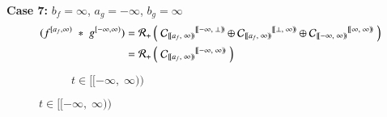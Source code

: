 \textbf{Case 7:} $b_f=\infty$, $a_g =-\infty$, $b_g=\infty$
\begin{align*}
	(f^{[a_f,\infty)} \;*\; g^{[-\infty,\infty)})
	= \R[+] &\left( \; 
			{\C[ [\![a_f,\;\infty)\!) ]}^{[\![-\infty,\; \bot)\!)} \oplus
			{\C[ [\![a_f,\;\infty)\!) ]}^{[\![\bot,\; \infty)\!)} \oplus
			{\C[ [\![-\infty,\;\infty)\!) ]}^{[\![\infty,\; \infty)\!)} 
		\; \right) \\
	= \R[+] &\left( \; 
			{\C[ [\![a_f,\;\infty)\!) ]}^{[\![-\infty,\; \infty)\!)}
		\; \right)
\end{align*}
\vspace{-1.5cm}
\begin{figure}[h]
	\centering
	\begin{subfigure}[h]{0.4\textwidth}
		\caption{$t \in [\![-\infty, \; \infty)\!)$} 
		\centering
	\end{subfigure}
\end{figure}


